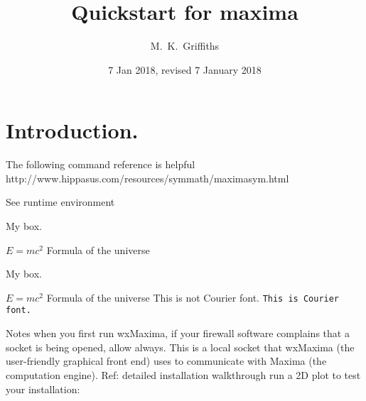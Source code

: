 \documentclass[11pt]{article}
\begin{document}
\title{Quickstart for maxima}
\author{M.~K.~Griffiths}
\date{7 Jan 2018, revised 7 January 2018}
\maketitle
\insert{}
\section{Introduction.}\label{S1}



The following command reference is helpful
http://www.hippasus.com/resources/symmath/maximasym.html


See runtime environment


\begin{tcolorbox}[colback=red!5!white,colframe=red!75!black]
  My box.


$E = mc^2$  Formula of the universe


\end{tcolorbox}


\begin{tcolorbox}[colback=green!5!white,colframe=green!75!black]
  My box.


$E = mc^2$  Formula of the universe
This is not Courier font. \texttt{This is Courier font.}

\end{tcolorbox}


Notes
when you first run wxMaxima, if your firewall software complains that a socket is being opened, allow always. This is a local socket that wxMaxima (the user-friendly graphical front end) uses to communicate with Maxima (the computation engine). Ref: detailed installation walkthrough
run a 2D plot to test your installation:
\end{document}
